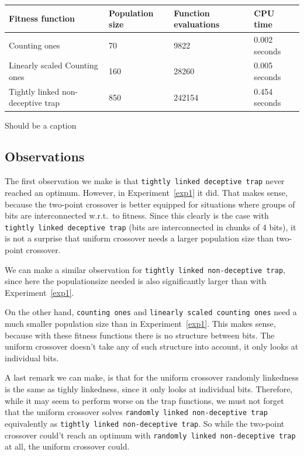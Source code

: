 \documentclass[12pt]{article}
\theoremstyle{definition}
\newcommand{\co}{\texttt{counting ones}}
\newcommand{\lsco}{\texttt{linearly scaled counting ones}}
\newcommand{\tdt}{\texttt{tightly linked deceptive trap}}
\newcommand{\tnt}{\texttt{tightly linked non-deceptive trap}}
\newcommand{\rnt}{\texttt{randomly linked non-deceptive trap}}
\begin{document}
\begin{adjustwidth}{0cm}{}
\begin{minipage}{\linewidth}
\centering
{}
\label{tab:title}
\begin{tabular}{lp{2.5cm}p{2.5cm}l}
\toprule[1.5pt]
\bf Fitness function & \bf Population size & \bf Function evaluations & \bf CPU time\\\midrule
Counting ones & 70 & 9822 & 0.002 seconds \\
Linearly scaled Counting ones & 160 & 28260 & 0.005 seconds \\
Tightly linked non-deceptive trap & 850 & 242154 & 0.454 seconds \\
\bottomrule[1.25pt]
\end{tabular}\par
\bigskip
Should be a caption
\end{minipage}
\end{adjustwidth}

\subsection*{Observations}
The first observation we make is that \tdt{} never reached an optimum.
However, in Experiment~\ref{exp1} it did.
That makes sense, because the two-point crossover is better equipped for situations where
groups of bits are interconnected w.r.t.\ to fitness.
Since this clearly is the case with \tdt{} (bits are interconnected in chunks of 4 bits),
it is not a surprise that uniform crossover needs a larger population size than
two-point crossover.

We can make a similar observation for \tnt{}, since here the populationsize needed is also
significantly larger than with Experiment~\ref{exp1}.

On the other hand, \co{} and \lsco{} need a much smaller population size than in
Experiment~\ref{exp1}.
This makes sense, because with these fitness functions there is no structure between bits.
The uniform crossover doesn't take any of such structure into account, it only looks at
individual bits.

A last remark we can make, is that for the uniform crossover randomly linkedness is the same
as tighly linkedness, since it only looks at individual bits.
Therefore, while it may seem to perform worse on the trap functions, we must not forget
that the uniform crossover solves \rnt{} equivalently as \tnt{}.
So while the two-point crossover could't reach an optimum with \rnt{} at all,
the uniform crossover could.
\end{document}
